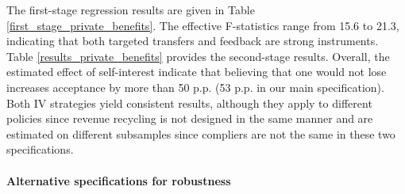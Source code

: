 \documentclass[12pt]{article} %
\begin{document}
The first-stage regression results are given in Table \ref{first_stage_private_benefits}. The effective F-statistics \citep{montiel_pflueger_2013} range from 15.6 to 21.3, indicating that both targeted transfers and feedback are strong instruments. Table \ref{results_private_benefits} provides the second-stage results. Overall, the estimated effect of self-interest indicate that believing that one would not lose increases acceptance by more than 50 p.p. (53 p.p. in our main specification). Both IV strategies yield consistent results, although they apply to different policies since revenue recycling is not designed in the same manner and are estimated on different subsamples since compliers are not the same in these two specifications.



 
\paragraph{Alternative specifications for robustness}
\end{document}
